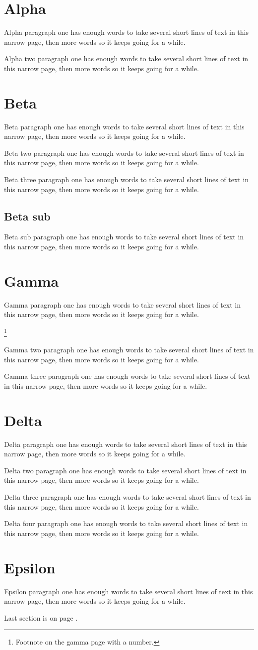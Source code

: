 \documentclass{article}
\newcommand\filler[1]{\par #1 paragraph one has enough words to take several short lines of text in this narrow page, then more words so it keeps going for a while.\par}
\begin{document}
\tableofcontents
\section{Alpha}\filler{Alpha}\filler{Alpha two}
\section{Beta}\filler{Beta}\filler{Beta two}\filler{Beta three}
\subsection{Beta sub}\filler{Beta sub}
\newpage
\section{Gamma}\filler{Gamma}\footnote{Footnote on the gamma page with a number.}
\filler{Gamma two}\filler{Gamma three}
\section{Delta}\filler{Delta}\filler{Delta two}\filler{Delta three}\filler{Delta four}
\clearpage
\section{Epsilon}\filler{Epsilon}
Last section is on page \pageref{last}.\label{last}
\end{document}
